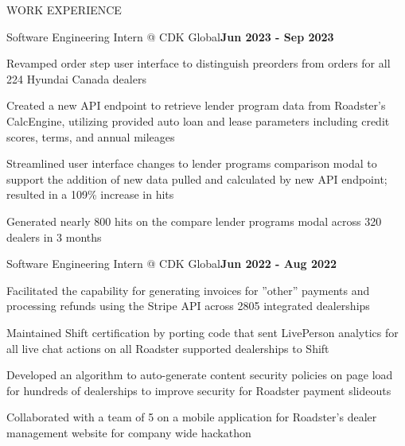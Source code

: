 \documentclass[]{resume}
\begin{document}
\begin{section}{WORK EXPERIENCE}
    \begin{subsection}{Software Engineering Intern @ CDK Global}{}{\textbf{Jun 2023 - Sep 2023}}{}
        \item Revamped order step user interface to distinguish preorders from orders for all 224 Hyundai Canada dealers
        \item Created a new API endpoint to retrieve lender program data from Roadster’s CalcEngine, utilizing provided auto loan and lease parameters including credit scores, terms, and annual mileages
        \item Streamlined user interface changes to lender programs comparison modal to support the addition of new data pulled and calculated by new API endpoint; resulted in a 109\% increase in hits
        \item Generated nearly 800 hits on the compare lender programs modal across 320 dealers in 3 months
    \end{subsection}
    
    \begin{subsection}{Software Engineering Intern @ CDK Global}{}{\textbf{Jun 2022 - Aug 2022}}{}
        \item Facilitated the capability for generating invoices for ”other” payments and processing refunds using the Stripe API across 2805 integrated dealerships
        \item Maintained Shift certification by porting code that sent LivePerson analytics for all live chat actions on all Roadster supported dealerships to Shift
        \item Developed an algorithm to auto-generate content security policies on page load for hundreds of dealerships to improve security for Roadster payment slideouts
        \item Collaborated with a team of 5 on a mobile application for Roadster’s dealer management website for company wide hackathon
    \end{subsection}
\end{section}
\end{document}

